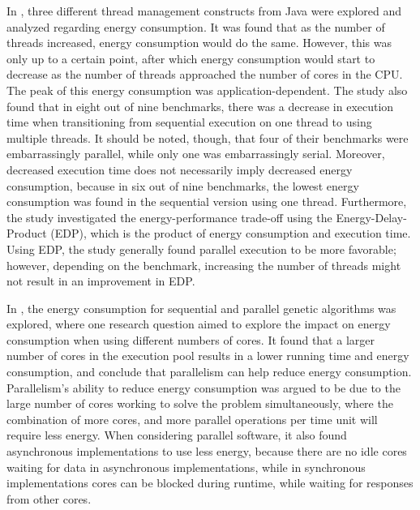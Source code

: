 In \cite{Pinto2014}, three different thread management constructs from Java were explored and analyzed regarding energy consumption. It was found that as the number of threads increased, energy consumption would do the same. However, this was only up to a certain point, after which energy consumption would start to decrease as the number of threads approached the number of cores in the CPU. The peak of this energy consumption was application-dependent. The study also found that in eight out of nine benchmarks, there was a decrease in execution time when transitioning from sequential execution on one thread to using multiple threads. It should be noted, though, that four of their benchmarks were embarrassingly parallel, while only one was embarrassingly serial. Moreover, decreased execution time does not necessarily imply decreased energy consumption, because in six out of nine benchmarks, the lowest energy consumption was found in the sequential version using one thread. Furthermore, the study investigated the energy-performance trade-off using the Energy-Delay-Product (EDP), which is the product of energy consumption and execution time. Using EDP, the study generally found parallel execution to be more favorable; however, depending on the benchmark, increasing the number of threads might not result in an improvement in EDP.\cite{Pinto2014}

In \cite{abdelhafez2019}, the energy consumption for sequential and parallel genetic algorithms was explored, where one research question aimed to explore the impact on energy consumption when using different numbers of cores. It found that a larger number of cores in the execution pool results in a lower running time and energy consumption, and conclude that parallelism can help reduce energy consumption. Parallelism's ability to reduce energy consumption was argued to be due to the large number of cores working to solve the problem simultaneously, where the combination of more cores, and more parallel operations per time unit will require less energy. When considering parallel software, it also found asynchronous implementations to use less energy, because there are no idle cores waiting for data in asynchronous implementations, while in synchronous implementations cores can be blocked during runtime, while waiting for responses from other cores.

